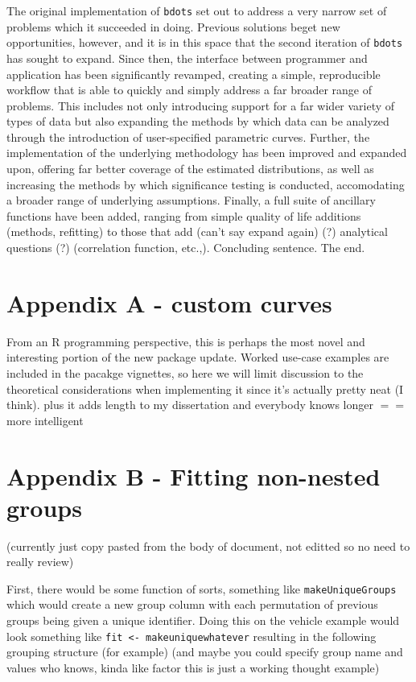 \documentclass{article}
\newcommand{\xt}{\texttt}%
\begin{document}
The original implementation of \xt{bdots} set out to address a very narrow set of problems which it succeeded in doing. Previous solutions beget new opportunities, however, and it is in this space that the second iteration of \xt{bdots} has sought to expand. Since then, the interface between programmer and application has been significantly revamped, creating a simple, reproducible workflow that is able to quickly and simply address a far broader range of problems. This includes not only introducing support for a far wider variety of types of data but also expanding the methods by which data can be analyzed through the introduction of user-specified parametric curves. Further, the implementation of the underlying methodology has been improved and expanded upon, offering far better coverage of the estimated distributions, as well as increasing the methods by which significance testing is conducted, accomodating a broader range of underlying assumptions. Finally, a full suite of ancillary functions have been added, ranging from simple quality of life additions (methods, refitting) to those that add (can't say expand again) (?) analytical questions (?) (correlation function, etc.,). Concluding sentence. The end.


\appendix

\section*{Appendix A - custom curves}

From an R programming perspective, this is perhaps the most novel and interesting portion of the new package update. Worked use-case examples are included in the pacakge vignettes, so here we will limit discussion to the theoretical considerations when implementing it since it's actually pretty neat (I think). plus it adds length to my dissertation and everybody knows longer $==$ more intelligent

\section*{Appendix B - Fitting non-nested groups}

(currently just copy pasted from the body of document, not editted so no need to really review)

First, there would be some function of sorts, something like \xt{makeUniqueGroups} which would create a new group column with each permutation of previous groups being given a unique identifier. Doing this on the vehicle example would look something like \xt{fit <- makeuniquewhatever} resulting in the following grouping structure (for example) (and maybe you could specify group name and values who knows, kinda like factor this is just a working thought example)
\end{document}
